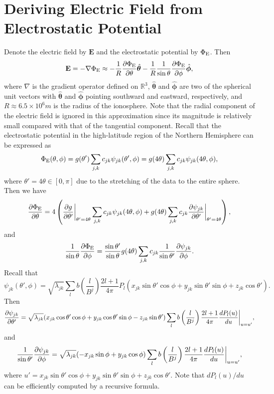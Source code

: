 \documentclass[aoas,preprint]{imsart}
\numberwithin{equation}{section}
\theoremstyle{plain}
\begin{document}
\section{Deriving Electric Field from Electrostatic Potential}\label{sec:electric_field}
Denote the electric field by $\textbf{E}$ and the electrostatic potential by $\Phi_{\rm E}$. Then
$$\textbf{E}=-\nabla \Phi_{\rm E}\approx-\frac{1}{R}\frac{\partial \Phi_{\rm E}}{\partial \theta}\hat{\bm{\theta}}-\frac{1}{R} \frac{1}{\sin \theta} \frac{\partial \Phi_{\rm E}}{\partial \phi}\hat{\bm{\phi}},$$
where $\nabla$ is the gradient operator defined on $\mathbb{R}^3$, $\hat{\bm{\theta}}$ and $\hat{\bm{\phi}}$ are two of the spherical unit vectors with $\hat{\bm{\theta}}$ and $\hat{\bm{\phi}}$ pointing southward and eastward, respectively, and $R \approx 6.5 \times 10^6 m$ is the radius of the ionosphere. Note that the radial component of the electric field is ignored in this approximation since its magnitude is relatively small compared with that of the tangential component.
Recall that the electrostatic potential in the high-latitude region of the Northern Hemisphere can be expressed as
$$\Phi_{\rm E}(\theta, \phi)=g(\theta')\sum_{j, k}c_{jk}\psi_{jk}(\theta', \phi)=g(4\theta)\sum_{j, k}c_{jk}\psi_{jk}(4\theta, \phi),$$
where $\theta'=4\theta\in [0, \pi]$ due to the stretching of the data to the entire sphere.
Then we have
$$\frac{\partial \Phi_{\rm E}}{\partial \theta}=4 \left(  \frac{\partial g}{\partial \theta'}\bigg{|}_{\theta'=4\theta}\sum_{j, k}c_{jk}\psi_{jk}(4\theta, \phi)+g(4\theta)\sum_{j, k}c_{jk}\frac{\partial \psi_{jk}}{\partial \theta' }\bigg{|}_{\theta'=4\theta}\right),$$
and
$$\frac{1}{\sin \theta}\frac{\partial \Phi_{\rm E}}{\partial \phi}=\frac{\sin \theta'}{\sin \theta}g(4\theta)\sum_{j, k}c_{jk}\frac{1}{\sin \theta'}\frac{\partial \psi_{jk}}{\partial \phi}.$$
Recall that 
$$\psi_{jk}(\theta', \phi)=\sqrt{\lambda_{jk}}\sum_l b\left( \frac{l}{B^j} \right)\frac{2l+1}{4\pi}P_l(x_{jk}\sin \theta' \cos \phi +y_{jk} \sin \theta' \sin \phi + z_{jk}\cos \theta' ).$$
Then
$$\frac{\partial \psi_{jk}}{\partial \theta'}=\sqrt{\lambda_{jk}}(x_{jk}\cos \theta' \cos \phi +y_{jk}\cos \theta' \sin \phi  -z_{jk} \sin \theta' ) \sum_l b\left( \frac{l}{B^j} \right)\frac{2l+1}{4\pi}\frac{d P_l(u)}{d u}\bigg{|}_{u=u'},$$
and
$$\frac{1}{\sin \theta'}\frac{\partial \psi_{jk}}{\partial \phi}=\sqrt{\lambda_{jk}}(-x_{jk} \sin \phi + y_{jk}\cos \phi )\sum_l b\left( \frac{l}{B^j} \right)\frac{2l+1}{4\pi}\frac{d P_l(u)}{d u}\bigg{|}_{u=u'},$$
where $u'=x_{jk}\sin \theta' \cos \phi +y_{jk} \sin \theta' \sin \phi + z_{jk}\cos \theta' $. Note that $dP_l(u)/du$ can be efficiently computed by a recursive formula.
\end{document}
